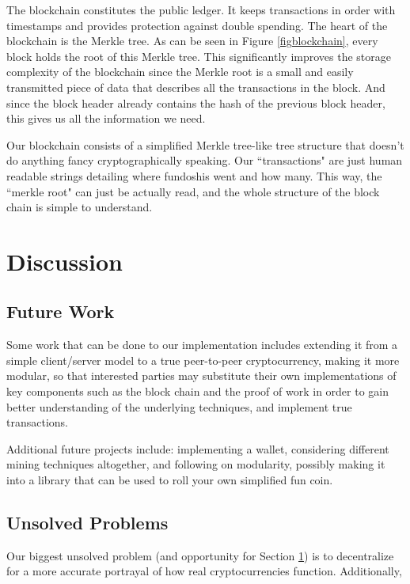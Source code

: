 \documentclass[12pt]{article}
\begin{document}
The blockchain constitutes the public ledger. It keeps transactions in order with timestamps and provides protection against double spending. The heart of the blockchain is the Merkle tree. As can be seen in Figure \ref{figblockchain}, every block holds the root of this Merkle tree. This significantly improves the storage complexity of the blockchain since the Merkle root is a small and easily transmitted piece of data that describes all the transactions in the block. And since the block header already contains the hash of the previous block header, this gives us all the information we need. 


Our blockchain consists of a simplified Merkle tree-like tree structure that doesn't do anything fancy cryptographically speaking. Our ``transactions" are just human readable strings detailing where fundoshis went and how many. This way, the ``merkle root" can just be actually read, and the whole structure of the block chain is simple to understand.

\section{Discussion}\label{future}
\subsection{Future Work}\label{work}
Some work that can be done to our implementation includes extending it from a simple client/server model to a true peer-to-peer cryptocurrency, making it more modular, so that interested parties may substitute their own implementations of key components such as the block chain and the proof of work in order to gain better understanding of the underlying techniques, and implement true transactions. 

Additional future projects include: implementing a wallet, considering different mining techniques altogether, and following on modularity, possibly making it into a library that can be used to roll your own simplified fun coin.

\subsection{Unsolved Problems}\label{unsolved}
Our biggest unsolved problem (and opportunity for Section \ref{future}) is to decentralize for a more accurate portrayal of how real cryptocurrencies function. Additionally, 



\end{document}
